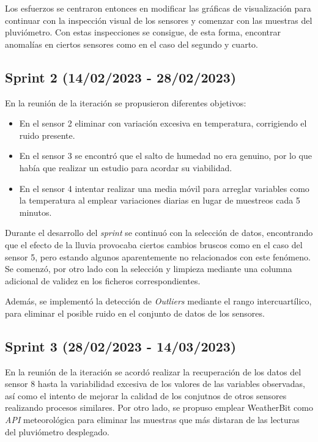 Los esfuerzos se centraron entonces en modificar las gráficas de visualización para continuar con la inspección visual de los sensores 
y comenzar con las muestras del pluviómetro.
Con estas inspecciones se consigue, de esta forma, encontrar anomalías en ciertos sensores como en el caso del segundo y cuarto.

\subsection{Sprint 2 (14/02/2023 - 28/02/2023)}
En la reunión de la iteración se propusieron diferentes objetivos:
\begin{itemize}
    \item En el sensor 2 eliminar con variación excesiva en temperatura, corrigiendo el ruido presente.
    \item En el sensor 3 se encontró que el salto de humedad no era genuino, por lo que había que realizar un estudio para acordar su viabilidad.
    \item En el sensor 4 intentar realizar una media móvil para arreglar variables como la temperatura al emplear variaciones diarias en lugar de 
        muestreos cada 5 minutos.
\end{itemize}

Durante el desarrollo del \textit{sprint} se continuó con la selección de datos, encontrando que el efecto de la lluvia provocaba ciertos cambios 
bruscos como en el caso del sensor 5, pero estando algunos aparentemente no relacionados con este fenómeno.
Se comenzó, por otro lado con la selección y limpieza mediante una columna adicional de validez en los ficheros correspondientes.

Además, se implementó la detección de \textit{Outliers} mediante el rango intercuartílico, para eliminar el posible ruido en el conjunto de datos
de los sensores.

\subsection{Sprint 3 (28/02/2023 - 14/03/2023)}
En la reunión de la iteración se acordó realizar la recuperación de los datos del sensor 8 hasta la variabilidad excesiva de los valores de las
variables observadas, así como el intento de mejorar la calidad de los conjutnos de otros sensores realizando procesos similares.
Por otro lado, se propuso emplear WeatherBit como \textit{API} meteorológica para eliminar las muestras que más distaran de las lecturas del 
pluviómetro desplegado.

